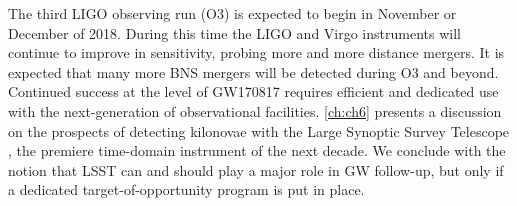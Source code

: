 The third LIGO observing run (O3) is expected to begin in November or December of 2018. During this time the LIGO and Virgo instruments will continue to improve in sensitivity, probing more and more distance mergers. It is expected that many more BNS mergers will be detected during O3 and beyond. Continued success at the level of GW170817 requires efficient and dedicated use with the next-generation of observational facilities. \cref{ch:ch6} presents a discussion on the prospects of detecting kilonovae with the Large Synoptic Survey Telescope \citep[LSST;][]{Ivezic+09}, the premiere time-domain instrument of the next decade. We conclude with the notion that LSST can and should play a major role in GW follow-up, but only if a dedicated target-of-opportunity program is put in place.
